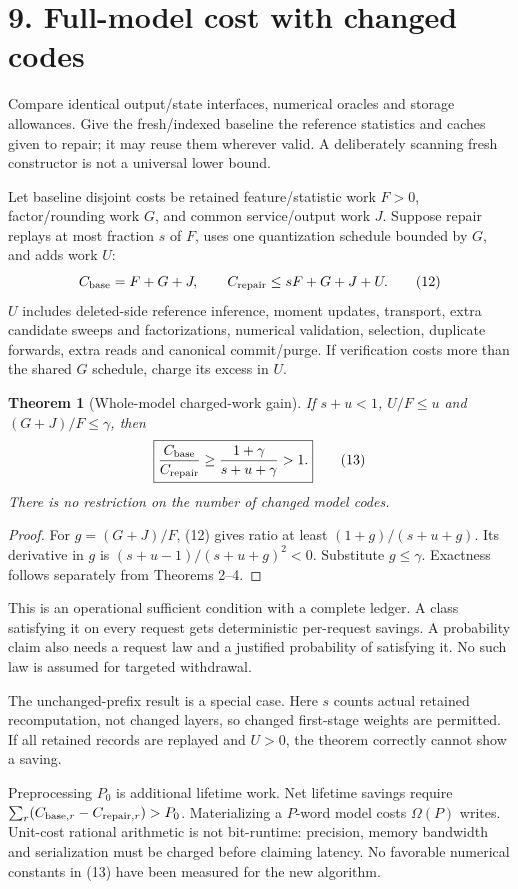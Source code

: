 \documentclass[11pt]{article}
\newtheorem{theorem}{Theorem}\newtheorem{lemma}{Lemma}\newtheorem{corollary}{Corollary}
\begin{document}
\newpage
\section*{9. Full-model cost with changed codes}
Compare identical output/state interfaces, numerical oracles and storage allowances. Give the fresh/indexed baseline the reference statistics and caches given to repair; it may reuse them wherever valid. A deliberately scanning fresh constructor is not a universal lower bound.

Let baseline disjoint costs be retained feature/statistic work $F>0$, factor/rounding work $G$, and common service/output work $J$. Suppose repair replays at most fraction $s$ of $F$, uses one quantization schedule bounded by $G$, and adds work $U$:
\[
 C_{\rm base}=F+G+J,\qquad
 C_{\rm repair}\leq sF+G+J+U. \tag{12}
\]
$U$ includes deleted-side reference inference, moment updates, transport, extra candidate sweeps and factorizations, numerical validation, selection, duplicate forwards, extra reads and canonical commit/purge. If verification costs more than the shared $G$ schedule, charge its excess in $U$.

\begin{theorem}[Whole-model charged-work gain]
If $s+u<1$, $U/F\leq u$ and $(G+J)/F\leq\gamma$, then
\[
 \boxed{\frac{C_{\rm base}}{C_{\rm repair}}
 \geq\frac{1+\gamma}{s+u+\gamma}>1.} \tag{13}
\]
There is no restriction on the number of changed model codes.
\end{theorem}
\begin{proof}
For $g=(G+J)/F$, (12) gives ratio at least $(1+g)/(s+u+g)$. Its derivative in $g$ is $(s+u-1)/(s+u+g)^2<0$. Substitute $g\leq\gamma$. Exactness follows separately from Theorems 2--4.
\end{proof}

This is an operational sufficient condition with a complete ledger. A class satisfying it on every request gets deterministic per-request savings. A probability claim also needs a request law and a justified probability of satisfying it. No such law is assumed for targeted withdrawal.

The unchanged-prefix result is a special case. Here $s$ counts actual retained recomputation, not changed layers, so changed first-stage weights are permitted. If all retained records are replayed and $U>0$, the theorem correctly cannot show a saving.

Preprocessing $P_0$ is additional lifetime work. Net lifetime savings require $\sum_r(C_{{\rm base},r}-C_{{\rm repair},r})>P_0$. Materializing a $P$-word model costs $\Omega(P)$ writes. Unit-cost rational arithmetic is not bit-runtime: precision, memory bandwidth and serialization must be charged before claiming latency. No favorable numerical constants in (13) have been measured for the new algorithm.
\end{document}

